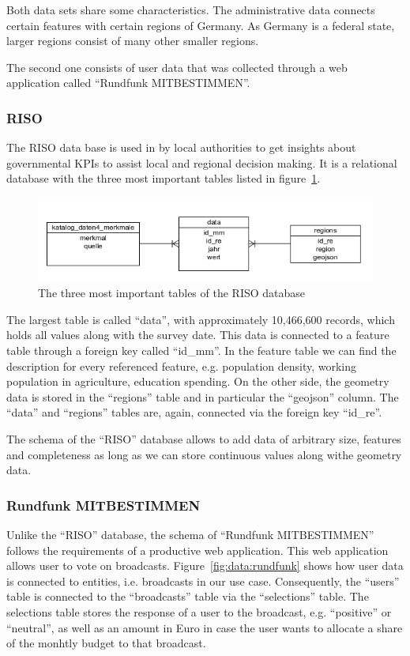 \documentclass{article}
\begin{document}
Both data sets share some characteristics.
The administrative data connects certain features with certain regions of Germany.
As Germany is a federal state, larger regions consist of many other smaller regions.

The second one consists of user data that was collected through a web application called ``Rundfunk MITBESTIMMEN''.


\subsubsection{RISO}

The RISO data base is used in by local authorities to get insights about governmental KPIs to assist local and regional decision making.
It is a relational database with the three most important tables listed in figure~\ref{fig:data:riso}.
\begin{figure}[h]
\centering
  \includegraphics[width=\textwidth]{images/riso}
  \caption{The three most important tables of the RISO database}
  \label{fig:data:riso}
\end{figure}

The largest table is called ``data'', with approximately 10,466,600 records, which holds all values along with the survey date.
This data is connected to a feature table through a foreign key called ``id\_mm''.
In the feature table we can find the description for every referenced feature, e.g. population density, working population in agriculture, education spending.
On the other side, the geometry data is stored in the ``regions'' table and in particular the ``geojson'' column.
The ``data'' and ``regions'' tables are, again, connected via the foreign key ``id\_re''.

The schema of the ``RISO'' database allows to add data of arbitrary size, features and completeness as long as we can store continuous values along withe geometry data.


\subsubsection{Rundfunk MITBESTIMMEN}
Unlike the ``RISO'' database, the schema of ``Rundfunk MITBESTIMMEN'' follows the requirements of a productive web application.
This web application allows user to vote on broadcasts.
Figure~\ref{fig:data:rundfunk} shows how user data is connected to entities, i.e. broadcasts in our use case.
Consequently, the ``users'' table is connected to the ``broadcasts'' table via the ``selections'' table.
The selections table stores the response of a user to the broadcast, e.g. ``positive'' or ``neutral'', as well as an amount in Euro in case the user wants to allocate a share of the monhtly budget to that broadcast.
\end{document}
